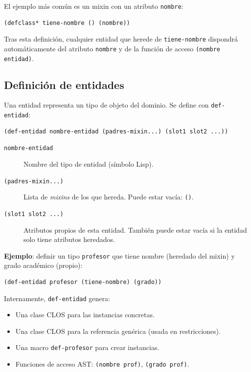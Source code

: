 \documentclass[12pt,a4paper]{article}
\newcommand{\code}[1]{\texttt{#1}}
\begin{document}
El ejemplo más común es un mixin con un atributo \code{nombre}:

\begin{lstlisting}[style=lisp, caption={Ejemplo de mixin}]
(defclass* tiene-nombre () (nombre))
\end{lstlisting}

Tras esta definición, cualquier entidad que herede de \code{tiene-nombre}
dispondrá automáticamente del atributo \code{nombre} y de la función de
acceso \code{(nombre entidad)}.

\subsection{Definición de entidades}
\label{sec:entidades}

Una entidad representa un tipo de objeto del dominio. Se define con
\code{def-entidad}:

\begin{lstlisting}[style=lisp, caption={Sintaxis de def-entidad}]
(def-entidad nombre-entidad (padres-mixin...) (slot1 slot2 ...))
\end{lstlisting}

\begin{description}
  \item[\code{nombre-entidad}] Nombre del tipo de entidad (símbolo Lisp).
  \item[\code{(padres-mixin...)}] Lista de \textit{mixins} de los que
    hereda. Puede estar vacía: \code{()}.
  \item[\code{(slot1 slot2 ...)}] Atributos propios de esta entidad.
    También puede estar vacía si la entidad solo tiene atributos heredados.
\end{description}

\textbf{Ejemplo}: definir un tipo \code{profesor} que tiene nombre
(heredado del mixin) y grado académico (propio):

\begin{lstlisting}[style=lisp, caption={Definición de la entidad profesor}]
(def-entidad profesor (tiene-nombre) (grado))
\end{lstlisting}

Internamente, \code{def-entidad} genera:
\begin{itemize}
  \item Una clase CLOS para las instancias concretas.
  \item Una clase CLOS para la referencia genérica (usada en restricciones).
  \item Una macro \code{def-profesor} para crear instancias.
  \item Funciones de acceso AST: \code{(nombre prof)}, \code{(grado prof)}.
\end{itemize}
\end{document}
